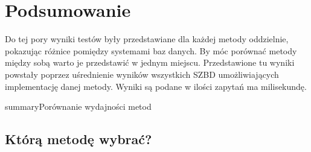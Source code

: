 \chapter{Podsumowanie}

Do tej pory wyniki testów były przedstawiane dla każdej metody oddzielnie, pokazując różnice pomiędzy systemami baz danych.
By móc porównać metody między sobą warto je przedstawić w jednym miejscu.
Przedstawione tu wyniki powstały poprzez uśrednienie wyników wszystkich SZBD umożliwiających implementację danej metody.
Wyniki są podane w ilości zapytań ma milisekundę.


\begin{qxfig}{summary}{Porównanie wydajności metod}
\end{qxfig}



%
%
%



\section*{Którą metodę wybrać?}



